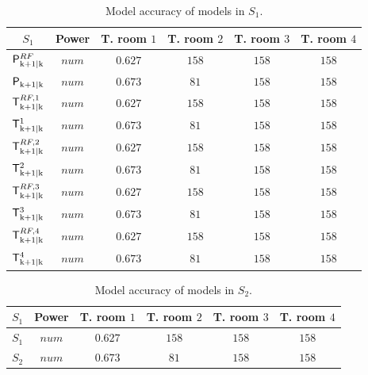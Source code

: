 \begin{table}[h!]
	\centering
	\caption{Model accuracy of models in $S_1$.}
	\captionsetup{justification=centering}
	\begin{tabular}{c|c|c|c|c|c}
		\toprule
		$S_1$     & Power & T. room $1$ & T. room $2$ & T. room $3$ & T. room $4$  \\ 
		\midrule
			$\mathsf{P}^{RF}_{\mathrm{k+1|k}}$ & $num$ & $0.627$        & $158$          & $158$           & $158$\\
			$\mathsf{P}_{\mathrm{k+1|k}}$      & $num$ & $0.673$        & $81$           & $158$           & $158$\\
			$\mathsf{T}^{RF,1}_{\mathrm{k+1|k}}$ & $num$ & $0.627$        & $158$          & $158$           & $158$\\
			$\mathsf{T}^1_{\mathrm{k+1|k}}$      & $num$ & $0.673$        & $81$           & $158$           & $158$\\
			$\mathsf{T}^{RF,2}_{\mathrm{k+1|k}}$ & $num$ & $0.627$        & $158$          & $158$           & $158$\\
			$\mathsf{T}^2_{\mathrm{k+1|k}}$      & $num$ & $0.673$        & $81$           & $158$           & $158$\\
			$\mathsf{T}^{RF,3}_{\mathrm{k+1|k}}$ & $num$ & $0.627$        & $158$          & $158$           & $158$\\
			$\mathsf{T}^3_{\mathrm{k+1|k}}$      & $num$ & $0.673$        & $81$           & $158$           & $158$\\
			$\mathsf{T}^{RF,4}_{\mathrm{k+1|k}}$ & $num$ & $0.627$        & $158$          & $158$           & $158$\\
			$\mathsf{T}^4_{\mathrm{k+1|k}}$      & $num$ & $0.673$        & $81$           & $158$           & $158$\\
		\bottomrule
	\end{tabular}
	\label{T:S1accuracy}
\end{table}

\begin{table}[h!]
	\centering
	\caption{Model accuracy of models in $S_2$.}
	\captionsetup{justification=centering}
	\begin{tabular}{c|c|c|c|c|c}
		\toprule
		$S_1$     & Power & T. room $1$ & T. room $2$ & T. room $3$ & T. room $4$  \\ 
		\midrule
		$S_1$ & $num$ & $0.627$        & $158$          & $158$           & $158$\\
		$S_2$ & $num$ & $0.673$        & $81$           & $158$           & $158$\\
		\bottomrule
	\end{tabular}
	\label{T:S2accuracy}
\end{table}


